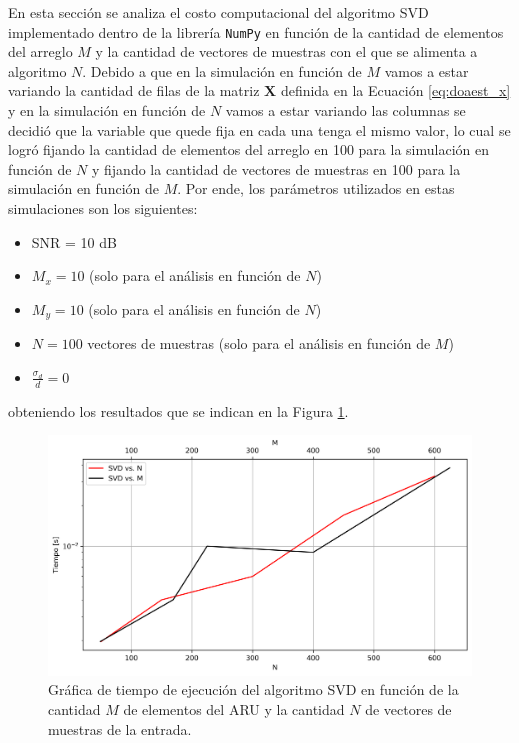 En esta sección se analiza el costo computacional del algoritmo SVD implementado dentro de la librería \texttt{NumPy} \cite{bib:numpy} en función de la cantidad de elementos del arreglo $M$ y la cantidad de vectores de muestras con el que se alimenta a algoritmo $N$. Debido a que en la simulación en función de $M$ vamos a estar variando la cantidad de filas de la matriz $\mathbf{X}$ definida en la Ecuación \ref{eq:doaest_x} y en la simulación en función de $N$ vamos a estar variando las columnas se decidió que la variable que quede fija en cada una tenga el mismo valor, lo cual se logró fijando la cantidad de elementos del arreglo en 100 para la simulación en función de $N$ y fijando la cantidad de vectores de muestras en 100 para la simulación en función de $M$. Por ende, los parámetros utilizados en estas simulaciones son los siguientes:
\begin{itemize}
    \item SNR = 10 dB
    \item $M_x = 10$ (solo para el análisis en función de $N$)
    \item $M_y = 10$ (solo para el análisis en función de $N$)
    \item $N = 100$ vectores de muestras (solo para el análisis en función de $M$)
    \item $\frac{\sigma_d}{d}=0$
\end{itemize}
obteniendo los resultados que se indican en la Figura \ref{fig:svd_vs_n_m}.
\begin{figure}[ht!]
    \centering
    \includegraphics[width=0.9\linewidth]{images/03-DOAEst/svd_vs_n_m.png}
    \caption{Gráfica de tiempo de ejecución del algoritmo SVD en función de la cantidad $M$ de elementos del ARU y la cantidad $N$ de vectores de muestras de la entrada.}
    \label{fig:svd_vs_n_m}
\end{figure}

